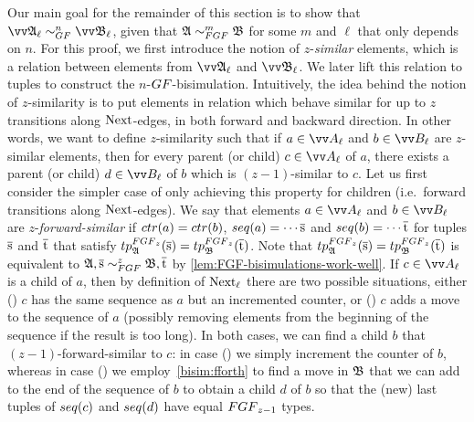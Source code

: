 Our main goal for the remainder of this section is to show that $\unravel{A}_{\ell} \bisimto_{\GF}^{n} \unravel{B}_{\ell}$, given that $\str{A} \bisimto_{\FGF}^{m} \str{B}$ for some $m$ and $\ell$ that only depends on $n$.
For this proof, we first introduce the notion of $z$-\emph{similar} elements, which is a relation between elements from $\unravel{A}_{\ell}$ and $\unravel{B}_{\ell}$.
We later lift this relation to tuples to construct the $n$-$\GF$-bisimulation.
Intuitively, the idea behind the notion of $z$-similarity is to put elements in relation which behave similar for up to $z$ transitions along $\mathrm{Next}$-edges, in both forward and backward direction.
In other words, we want to define $z$-similarity such that if $a \in \unraveldom{A}_{\ell}$ and $b \in \unraveldom{B}_{\ell}$ are $z$-similar elements, then for every parent (or child) $c \in \unraveldom{A}_{\ell}$ of $a$, there exists a parent (or child) $d \in \unraveldom{B}_{\ell}$ of $b$ which is $(z-1)$-similar to $c$.
Let us first consider the simpler case of only achieving this property for children (i.e.\ forward transitions along $\mathrm{Next}$-edges).
We say that elements $a \in \unraveldom{A}_{\ell}$ and $b \in \unraveldom{B}_{\ell}$ are $z$-\emph{forward-similar} if $\ctr{a} = \ctr{b}$, $\seq{a} = \cdots \elemtuples$ and $\seq{b} = \cdots \elemtuplet$ for tuples $\overline{\mathrm{s}}$ and $\overline{\mathrm{t}}$ that satisfy $\tp{\FGF_{z}}{\str{A}}{\elemtuples} = \tp{\FGF_{z}}{\str{B}}{\elemtuplet}$.
Note that $\tp{\FGF_{z}}{\str{A}}{\elemtuples} = \tp{\FGF_{z}}{\str{B}}{\elemtuplet}$ is equivalent to $\str{A}, \elemtuples \bisimto_{\FGF}^{z} \str{B}, \elemtuplet$ by \cref{lem:FGF-bisimulations-work-well}.
If $c \in \unraveldom{A}_{\ell}$ is a child of $a$, then by definition of $\mathrm{Next}_{\ell}$ there are two possible situations, either () $c$ has the same sequence as $a$ but an incremented counter, or () $c$ adds a move to the sequence of $a$ (possibly removing elements from the beginning of the sequence if the result is too long).
In both cases, we can find a child $b$ that $(z-1)$-forward-similar to $c$: in case () we simply increment the counter of $b$, whereas in case () we employ~\ref{bisim:fforth} to find a move in ${\mathfrak{B}}$ that we can add to the end of the sequence of $b$ to obtain a child $d$ of $b$ so that the (new) last tuples of $\seq{c}$ and $\seq{d}$ have equal $\FGF_{z-1}$ types.

